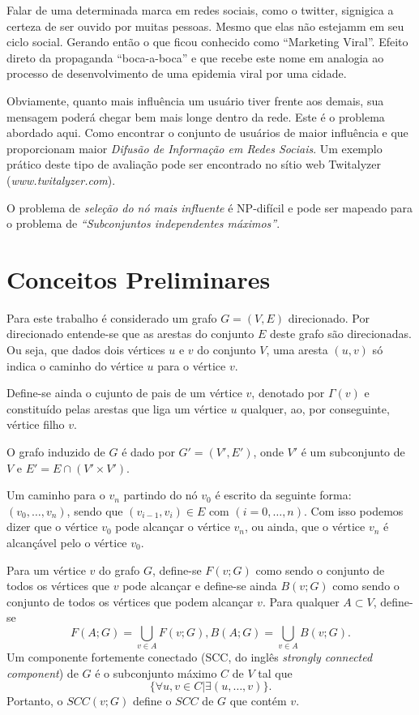 \documentclass{acm_proc_article-sp}
\begin{document}
Falar de uma determinada marca em redes sociais, como o twitter, signigica a certeza de ser ouvido por muitas pessoas. Mesmo que elas
não estejamm em seu ciclo social. Gerando então o que ficou conhecido como ``Marketing Viral''. Efeito direto da propaganda 
``boca-a-boca'' e que recebe este nome em analogia ao processo de desenvolvimento de uma epidemia viral por uma cidade.

Obviamente, quanto mais influência um usuário tiver frente aos demais, sua mensagem poderá chegar bem mais longe dentro da rede. 
Este é o problema abordado aqui. Como encontrar o conjunto de usuários de maior influência e que proporcionam maior \textit{Difusão
de Informação em Redes Sociais}. Um exemplo prático deste tipo de avaliação pode ser encontrado no sítio web Twitalyzer 
(\textit{www.twitalyzer.com}).

O problema de \textit{seleção do nó mais influente} é NP-difícil \cite{kempe:2003} e pode ser mapeado para o problema de \textit{``Subconjuntos 
independentes máximos''}.

\section{Conceitos Preliminares}
Para este trabalho é considerado um grafo $G = (V,E)$ direcionado. Por direcionado entende-se que as arestas do
conjunto $E$ deste grafo são direcionadas. Ou seja, que dados dois vértices $u$ e $v$ do conjunto $V$, uma aresta
$(u,v)$ só indica o caminho do vértice $u$ para o vértice $v$.

Define-se ainda o cujunto de pais de um vértice $v$, denotado por $\Gamma(v)$ e constituído pelas arestas
que liga um vértice $u$ qualquer, ao, por conseguinte, vértice filho $v$.

O grafo induzido de $G$ é dado por $G' = (V', E')$, onde $V'$ é um subconjunto de $V$ e $E'
= E \cap (V' \times V')$.

Um caminho para o $v_{n}$ partindo do nó $v_{0}$ é escrito da seguinte forma: $(v_{0}, \ldots, v_{n})$, sendo que
$(v_{i-1}, v_{i}) \in E$ com $(i=0,\ldots, n)$. Com isso podemos dizer que o vértice $v_{0}$ pode alcançar o
vértice $v_{n}$, ou ainda, que o vértice $v_{n}$ é alcançável pelo o vértice $v_{0}$. 

Para um vértice $v$ do grafo $G$, define-se $F(v;G)$ como sendo o conjunto de todos os vértices que $v$ pode
alcançar e define-se ainda $B(v;G)$ como sendo o conjunto de todos os vértices que podem alcançar $v$. Para
qualquer $A \subset V$, define-se
$$ 
F(A;G) = \bigcup_{v \in A} F(v;G), B(A;G) = \bigcup_{v \in A} B(v;G).
$$
Um componente fortemente conectado (SCC, do inglês \textit{strongly connected component}) de $G$ é o subconjunto
máximo $C$ de $V$ tal que
$$
\{\forall u,v \in C | \exists (u,\ldots ,v)\}.
$$
Portanto, o $SCC(v;G)$ define o $SCC$ de $G$ que contém $v$. 
\end{document}
